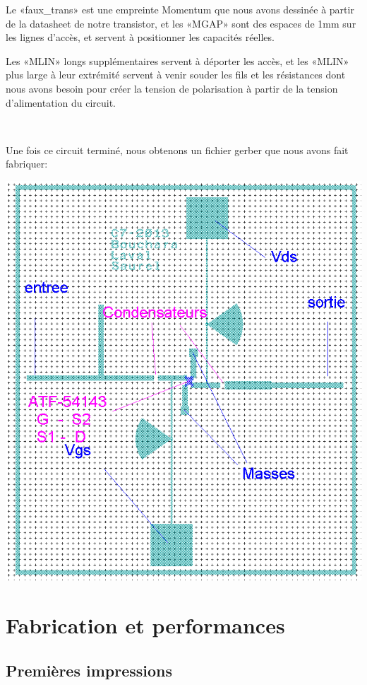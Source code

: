 \documentclass[12pt]{article}
\begin{document}
Le «faux\_trans» est une empreinte Momentum que nous avons dessinée à partir de la datasheet de notre transistor, et les «MGAP» sont des espaces de 1mm sur les lignes d’accès, et servent à positionner les capacités réelles.

Les «MLIN» longs supplémentaires servent à déporter les accès, et les «MLIN» plus large à leur extrémité servent à venir souder les fils et les résistances dont nous avons besoin pour créer la tension de polarisation à partir de la tension d’alimentation du circuit.

~

Une fois ce circuit terminé, nous obtenons un fichier gerber que nous avons fait fabriquer:

\begin{center}
\includegraphics[width=\linewidth]{img/gerber_final}
\end{center}

\section{Fabrication et performances}

\subsection{Premières impressions}
\end{document}
